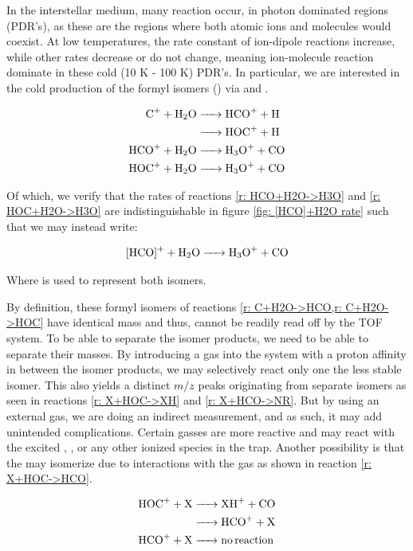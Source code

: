 In the interstellar medium, many reaction occur, in photon dominated regions (PDR's), as these are the regions where both atomic ions and molecules would coexist. At low temperatures, the rate constant of ion-dipole reactions increase, while other rates decrease or do not change, meaning ion-molecule reaction dominate in these cold (10 K - 100 K) PDR's. In particular, we are interested in the cold production of the formyl isomers () via  and .

\begin{align}
	\ce{C+ + H2O & -> HCO+ + H} \label{r: C+H2O->HCO} \\
	\ce{& -> HOC+ + H} \label{r: C+H2O->HOC} \\
	\ce{HCO+ + H2O & -> H3O+ + CO} \label{r: HCO+H2O->H3O} \\
	\ce{HOC+ + H2O & -> H3O+ + CO} \label{r: HOC+H2O->H3O}
\end{align}

Of which, we verify that the rates of reactions \ref{r: HCO+H2O->H3O} and \ref{r: HOC+H2O->H3O} are indistinguishable in figure \ref{fig: [HCO]+H2O rate} such that we may instead write:

\begin{equation}
	\ce{[HCO]+ + H2O -> H3O+ + CO} \label{r: [HCO]+H2O->H3O}
\end{equation}

Where \ce{[HCO]+} is used to represent both isomers. 

By definition, these formyl isomers of reactions \cref{r: C+H2O->HCO,r: C+H2O->HOC} have identical mass and thus, cannot be readily read off by the TOF system. To be able to separate the isomer products, we need to be able to separate their masses. By introducing a gas into the system with a proton affinity in between the isomer products, we may selectively react only one the less stable  isomer. This also yields a distinct $m/z$ peaks originating from separate isomers as seen in reactions \ref{r: X+HOC->XH} and \ref{r: X+HCO->NR}. But by using an external gas, we are doing an indirect measurement, and as such, it may add unintended complications. Certain gasses are more reactive and may react with the excited , , or any other ionized species in the trap. Another possibility is that the  may isomerize due to interactions with the gas as shown in reaction \ref{r: X+HOC->HCO}.\cite{Love1987}

\begin{align}
	\ce{HOC+ + X & -> XH+ + CO} \label{r: X+HOC->XH} \\
	\ce{& -> HCO+ + X} \label{r: X+HOC->HCO} \\
	\ce{HCO+ + X & -> no reaction} \label{r: X+HCO->NR}
\end{align}

